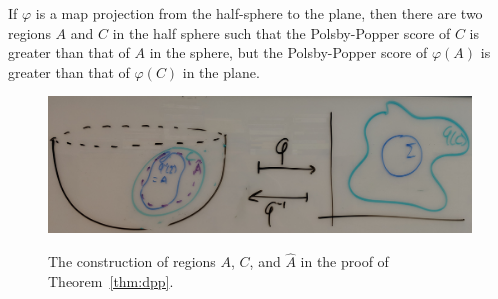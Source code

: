 \begin{theorem}\label{thm:dpp}
  If $\varphi$ is a map projection from the half-sphere to the plane,
  then there are two regions $A$ and $C$ in the half sphere such that
  the Polsby-Popper score of $C$ is greater than that of $A$ in the
  sphere, but the Polsby-Popper score of $\varphi(A)$ is greater than
  that of $\varphi(C)$ in the plane.
\end{theorem}
\begin{figure}\label{fig:dpp}
  \centering
  \includegraphics[width=.9\textwidth]{figs/dumb_pp_cropped.jpg}\\[1.5em]
  \caption{ The construction of regions $A$, $C$, and $\hat{A}$ in the proof of Theorem~\ref{thm:dpp}.}
\end{figure}

